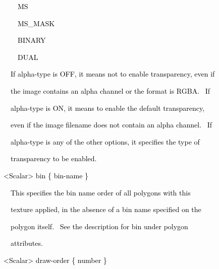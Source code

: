 \documentclass[a4paper]{article}
\newcommand\textstyleOOoComputerKeyWord[1]{\textrm{\textcolor[rgb]{0.0,0.0,0.5019608}{#1}}}
\begin{document}
{\color{black}
\textstyleOOoComputerKeyWord{\textcolor{black}{\ \ \ \ \ \ MS}}}

{\color{black}
\textstyleOOoComputerKeyWord{\textcolor{black}{\ \ \ \ \ \ MS\_MASK}}}

{\color{black}
\textstyleOOoComputerKeyWord{\textcolor{black}{\ \ \ \ \ \ BINARY}}}

{\color{black}
\textstyleOOoComputerKeyWord{\textcolor{black}{\ \ \ \ \ \ DUAL}}}


\bigskip

{\color{black}
\textstyleOOoComputerKeyWord{\textcolor{black}{\ \ \ \ If alpha-type is OFF, it means not to enable transparency, even
if}}}

{\color{black}
\textstyleOOoComputerKeyWord{\textcolor{black}{\ \ \ \ the image contains an alpha channel or the format is RGBA.
\ If}}}

{\color{black}
\textstyleOOoComputerKeyWord{\textcolor{black}{\ \ \ \ alpha-type is ON, it means to enable the default transparency,}}}

{\color{black}
\textstyleOOoComputerKeyWord{\textcolor{black}{\ \ \ \ even if the image filename does not contain an alpha channel.
\ If}}}

{\color{black}
\textstyleOOoComputerKeyWord{\textcolor{black}{\ \ \ \ alpha-type is any of the other options, it specifies the type
of}}}

{\color{black}
\textstyleOOoComputerKeyWord{\textcolor{black}{\ \ \ \ transparency to be enabled.}}}


\bigskip

{\color{black}
\textstyleOOoComputerKeyWord{\textcolor{black}{\ \ {\textless}Scalar{\textgreater} bin \{ bin-name \}}}}


\bigskip

{\color{black}
\textstyleOOoComputerKeyWord{\textcolor{black}{\ \ \ \ This specifies the bin name order of all polygons with this}}}

{\color{black}
\textstyleOOoComputerKeyWord{\textcolor{black}{\ \ \ \ texture applied, in the absence of a bin name specified on the}}}

{\color{black}
\textstyleOOoComputerKeyWord{\textcolor{black}{\ \ \ \ polygon itself. \ See the description for bin under polygon}}}

{\color{black}
\textstyleOOoComputerKeyWord{\textcolor{black}{\ \ \ \ attributes.}}}


\bigskip

{\color{black}
\textstyleOOoComputerKeyWord{\textcolor{black}{\ \ {\textless}Scalar{\textgreater} draw-order \{ number \}}}}
\end{document}
